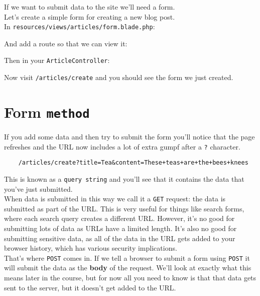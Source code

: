 If we want to submit data to the site we'll need a form.
\\

Let's create a simple form for creating a new blog post.
\\

In \texttt{resources/views/articles/form.blade.php}:


And add a route so that we can view it:


Then in your \texttt{ArticleController}:


Now visit \texttt{/articles/create} and you should see the form we just created.

\section{Form \texttt{method}}

If you add some data and then try to submit the form you'll notice that the page refreshes and the URL now includes a lot of extra gumpf after a \texttt{?} character.

\begin{verbatim}
    /articles/create?title=Tea&content=These+teas+are+the+bees+knees
\end{verbatim}

This is known as a \texttt{query string} and you'll see that it contains the data that you've just submitted.
\\

When data is submitted in this way we call it a \texttt{GET} request: the data is submitted as part of the URL. This is very useful for things like search forms, where each search query creates a different URL. However, it's no good for submitting lots of data as URLs have a limited length. It's also no good for submitting sensitive data, as all of the data in the URL gets added to your browser history, which has various security implications.
\\

That's where \texttt{POST} comes in. If we tell a browser to submit a form using \texttt{POST} it will submit the data as the \textbf{body} of the request. We'll look at exactly what this means later in the course, but for now all you need to know is that that data gets sent to the server, but it doesn't get added to the URL.
\\

